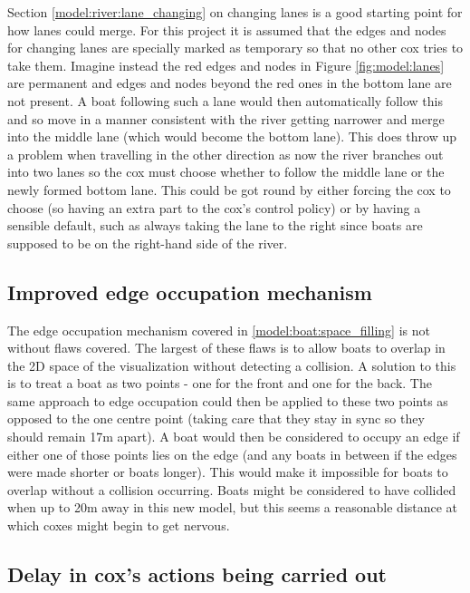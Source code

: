 Section \ref{model:river:lane_changing} on changing lanes is a good starting point for how lanes could merge. For this project it is assumed that the edges and nodes for changing lanes are specially marked as temporary so that no other cox tries to take them. Imagine instead the red edges and nodes in Figure \ref{fig:model:lanes} are permanent and edges and nodes beyond the red ones in the bottom lane are not present. A boat following such a lane would then automatically follow this and so move in a manner consistent with the river getting narrower and merge into the middle lane (which would become the bottom lane). This does throw up a problem when travelling in the other direction as now the river branches out into two lanes so the cox must choose whether to follow the middle lane or the newly formed bottom lane. This could be got round by either forcing the cox to choose (so having an extra part to the cox's control policy) or by having a sensible default, such as always taking the lane to the right since boats are supposed to be on the right-hand side of the river.

\subsection{Improved edge occupation mechanism}

The edge occupation mechanism covered in \ref{model:boat:space_filling} is not without flaws covered. The largest of these flaws is to allow boats to overlap in the 2D space of the visualization without detecting a collision. A solution to this is to treat a boat as two points - one for the front and one for the back. The same approach to edge occupation could then be applied to these two points as opposed to the one centre point (taking care that they stay in sync so they should remain 17m apart). A boat would then be considered to occupy an edge if either one of those points lies on the edge (and any boats in between if the edges were made shorter or boats longer). This would make it impossible for boats to overlap without a collision occurring. Boats might be considered to have collided when up to 20m away in this new model, but this seems a reasonable distance at which coxes might begin to get nervous.

\subsection{Delay in cox's actions being carried out}\label{model:future:action_delay}

